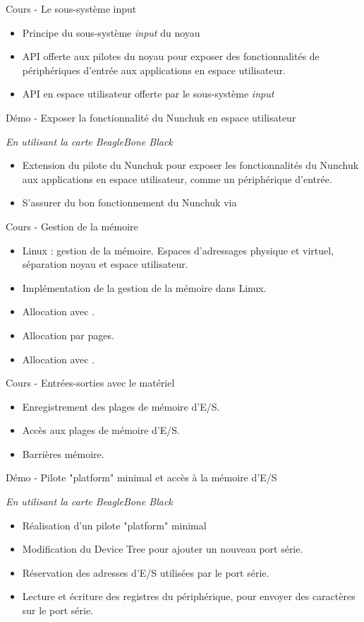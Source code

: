 \documentclass[a4paper,12pt,obeyspaces,spaces,hyphens]{article}
\begin{document}
\feagendatwocolumn
{Cours - Le sous-système input}
{
  \begin{itemize}
  \item Principe du sous-système {\em input} du noyau
  \item API offerte aux pilotes du noyau pour exposer
    des fonctionnalités de périphériques d'entrée aux
    applications en espace utilisateur.
  \item API en espace utilisateur offerte par le
    sous-système {\em input}
  \end{itemize}
}
{Démo - Exposer la fonctionnalité du Nunchuk en espace utilisateur}
{
  {\em En utilisant la carte BeagleBone Black}
  \begin{itemize}
  \item Extension du pilote du Nunchuk pour exposer les fonctionnalités
    du Nunchuk aux applications en espace utilisateur, comme
    un périphérique d'entrée.
  \item S'assurer du bon fonctionnement du Nunchuk via 
  \end{itemize}
}

\feagendatwocolumn
{Cours - Gestion de la mémoire}
{
  \begin{itemize}
  \item Linux : gestion de la mémoire. Espaces d'adressages physique et
     virtuel, séparation noyau et espace utilisateur.
  \item Implémentation de la gestion de la mémoire dans Linux.
  \item Allocation avec .
  \item Allocation par pages.
  \item Allocation avec .
  \end{itemize}
}
{Cours - Entrées-sorties avec le matériel}
{
  \begin{itemize}
  \item Enregistrement des plages de mémoire d'E/S.
  \item Accès aux plages de mémoire d'E/S.
  \item Barrières mémoire.
  \end{itemize}
}

\feagendaonecolumn
{Démo - Pilote "platform" minimal et accès à la mémoire d'E/S}
{
  {\em En utilisant la carte BeagleBone Black}
  \begin{itemize}
  \item Réalisation d'un pilote "platform" minimal
  \item Modification du Device Tree pour ajouter un nouveau
    port série.
  \item Réservation des adresses d'E/S utilisées par le port série.
  \item Lecture et écriture des registres du périphérique, pour
    envoyer des caractères sur le port série.
  \end{itemize}
}
\end{document}
